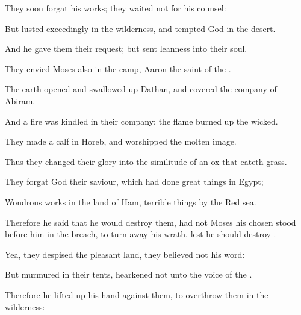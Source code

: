 {\Q {}They
soon
forgat his
works; they
waited not for his
counsel:


\par }{\Q {}But
lusted
exceedingly in the
wilderness, and
tempted
God in the
desert.


\par }{\Q {}And he
gave them their
request; but
sent
leanness into their
soul.


\par }{\Q {}They
envied
Moses also in the
camp,
{}
Aaron the
saint of the
{}.


\par }{\Q {}The
earth
opened and swallowed
up
Dathan, and
covered the
company of
Abiram.


\par }{\Q {}And a
fire was
kindled in their
company; the
flame burned
up the
wicked.


\par }{\Q {}They
made a
calf in
Horeb, and
worshipped the molten
image.


\par }{\Q {}Thus they
changed their
glory into the
similitude of an
ox that
eateth
grass.


\par }{\Q {}They
forgat
God their
saviour, which had
done great
things in
Egypt;


\par }{\Q {}Wondrous
works in the
land of
Ham,
{} terrible
things by the
Red
sea.


\par }{\Q {}Therefore he
said that he would
destroy them, had
not
Moses his
chosen
stood
before him in the
breach, to turn
away his
wrath, lest he should
destroy
{}.


\par }{\Q {}Yea, they
despised the
pleasant
land, they
believed not his
word:


\par }{\Q {}But
murmured in their
tents,
{}
hearkened not unto the
voice of the
{}.


\par }{\Q {}Therefore he lifted
up his
hand against them, to
overthrow them in the
wilderness:


}
